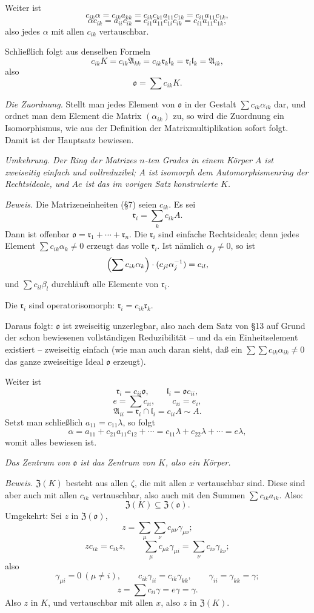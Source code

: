 \documentclass[11pt]{article}
\providecommand{\mA}{\mathfrak{A}}
\providecommand{\mo}{\mathfrak{o}}
\providecommand{\ml}{\mathfrak{l}}
\providecommand{\mr}{\mathfrak{r}}
\providecommand{\mZ}{\mathfrak{Z}}
\begin{document}
Weiter ist
\[
        c_{ik}\alpha=c_{ik}a_{kk}=c_{ik}c_{k1}a_{11}c_{1k}=c_{i1}a_{11}c_{1k},
\]
\[
        \alpha c_{ik}=a_{ii}c_{ik}=c_{i1}a_{11}c_{1i}c_{ik}=c_{i1}a_{11}c_{1k},
\]
also jedes $\alpha$ mit allen $c_{ik}$ vertauschbar.

Schließlich folgt aus denselben Formeln
\[
        c_{ik}K=c_{ik}\mA_{kk}=c_{ik}\mr_k\ml_k=\mr_i\ml_k=\mA_{ik},
\]
also
\[
        \mo=\sum c_{ik}K.
\]

\emph{Die Zuordnung.} Stellt man jedes Element von $\mo$ in der Gestalt $\sum c_{ik}\alpha_{ik}$ dar, und ordnet man dem Element die Matrix $(\alpha_{ik})$ zu, so wird die Zuordnung ein Isomorphismus, wie aus der Definition der Matrixmultiplikation sofort folgt. Damit ist der Hauptsatz bewiesen.

\emph{Umkehrung. Der Ring der Matrizes $n$-ten Grades in einem Körper $A$ ist zweiseitig einfach und vollreduzibel; $A$ ist isomorph dem Automorphismenring der Rechtsideale, und $Ae$ ist das im vorigen Satz konstruierte $K$.}

\emph{Beweis.} Die Matrizeneinheiten (§7) seien $c_{ik}$. Es sei
\[
        \mr_i=\sum_k c_{ik}A.
\]
Dann ist offenbar $\mo=\mr_1+\cdots+\mr_n$. Die $\mr_i$ sind einfache Rechtsideale; denn jedes Element $\sum c_{ik}\alpha_k\ne0$ erzeugt das volle $\mr_i$. Ist nämlich $\alpha_j\ne0$, so ist
\[
        \Bigl(\sum c_{ik}\alpha_k\Bigr)\cdot(c_{jl}\alpha_j^{-1})=c_{il},
\]
und $\sum c_{il}\beta_l$ durchläuft alle Elemente von $\mr_i$.

Die $\mr_i$ sind operatorisomorph: $\mr_i=c_{ik}\mr_k$.

Daraus folgt: $\mo$ ist zweiseitig unzerlegbar, also nach dem Satz von §13 auf Grund der schon bewiesenen vollständigen Reduzibilität -- und da ein Einheitselement existiert -- zweiseitig einfach (wie man auch daran sieht, daß ein $\sum\sum c_{ik}\alpha_{ik}\ne0$ das ganze zweiseitige Ideal $\mo$ erzeugt).

Weiter ist
\[
        \mr_i=c_{ii}\mo,
        \qquad
        \ml_i=\mo c_{ii},
\]
\[
        e=\sum c_{ii},
        \qquad c_{ii}=e_i,
\]
\[
        \mA_{ii}=\mr_i\cap\ml_i=c_{ii}A\sim A.
\]
Setzt man schließlich $a_{11}=c_{11}\lambda$, so folgt
\[
        \alpha=a_{11}+c_{21}a_{11}c_{12}+\cdots
        =c_{11}\lambda+c_{22}\lambda+\cdots=e\lambda,
\]
womit alles bewiesen ist.

\emph{Das Zentrum von $\mo$ ist das Zentrum von $K$, also ein Körper.}

\emph{Beweis.} $\mZ(K)$ besteht aus allen $\zeta$, die mit allen $x$ vertauschbar sind. Diese sind aber auch mit allen $c_{ik}$ vertauschbar, also auch mit den Summen $\sum c_{ik}a_{ik}$. Also:
\[
        \mZ(K)\subseteq\mZ(\mo).
\]
Umgekehrt: Sei $z$ in $\mZ(\mo)$,
\[
        z=\sum_\mu\sum_\nu c_{\mu\nu}\gamma_{\mu\nu};
\]
\[
        zc_{ik}=c_{ik}z,
        \qquad
        \sum_\mu c_{\mu k}\gamma_{\mu i}=\sum_\nu c_{i\nu}\gamma_{k\nu};
\]
also
\[
        \gamma_{\mu i}=0\ (\mu\ne i),
        \qquad
        c_{ik}\gamma_{ii}=c_{ik}\gamma_{kk},
        \qquad
        \gamma_{ii}=\gamma_{kk}=\gamma;
\]
\[
        z=\sum c_{ii}\gamma=e\gamma=\gamma.
\]
Also $z$ in $K$, und vertauschbar mit allen $x$, also $z$ in $\mZ(K)$.
\end{document}
